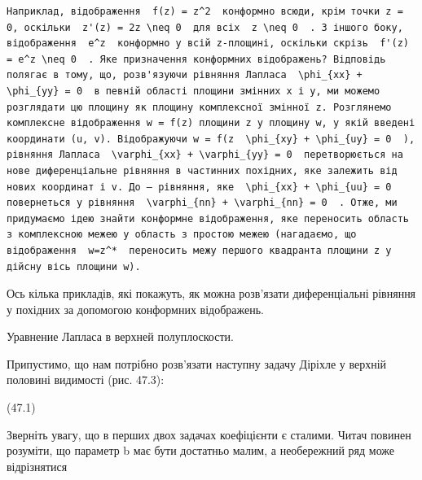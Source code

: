 \documentclass[
  ukrainian,
]{article}
\begin{document}
\begin{verbatim}
Наприклад, відображення  f(z) = z^2  конформно всюди, крім точки z = 0, оскільки  z'(z) = 2z \neq 0  для всіх  z \neq 0  . З іншого боку, відображення  e^z  конформно у всій z-площині, оскільки скрізь  f'(z) = e^z \neq 0  . Яке призначення конформних відображень? Відповідь полягає в тому, що, розв'язуючи рівняння Лапласа  \phi_{xx} + \phi_{yy} = 0  в певній області площини змінних x і y, ми можемо розглядати цю площину як площину комплексної змінної z. Розглянемо комплексне відображення w = f(z) площини z у площину w, у якій введені координати (u, v). Відображуючи w = f(z  \phi_{xy} + \phi_{uy} = 0  ), рівняння Лапласа  \varphi_{xx} + \varphi_{yy} = 0  перетворюється на нове диференціальне рівняння в частинних похідних, яке залежить від нових координат і v. До — рівняння, яке  \phi_{xx} + \phi_{uu} = 0  повернеться у рівняння  \varphi_{nn} + \varphi_{nn} = 0  . Отже, ми придумаємо ідею знайти конформне відображення, яке переносить область з комплексною межею у область з простою межею (нагадаємо, що відображення  w=z^*  переносить межу першого квадранта площини z у дійсну вісь площини w).
\end{verbatim}

Ось кілька прикладів, які покажуть, як можна розв'язати диференціальні
рівняння у похідних за допомогою конформних відображень.

Уравнение Лапласа в верхней полуплоскости.

Припустимо, що нам потрібно розв'язати наступну задачу Діріхле у верхній
половині видимості (рис. 47.3):

(47.1)

Зверніть увагу, що в перших двох задачах коефіцієнти є сталими. Читач
повинен розуміти, що параметр b має бути достатньо малим, а необережний
ряд може відрізнятися
\end{document}
